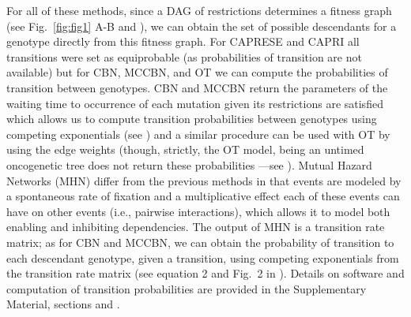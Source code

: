 \documentclass[a4paper,10pt]{article}
\begin{document}
For all of these methods, since a DAG of restrictions determines a fitness
graph (see Fig.~\ref{fig:fig1} A-B and
\cite{diaz-uriarte2018,diaz-uriarte2019a}), we can obtain the set of
possible descendants for a genotype directly from this fitness graph.  For
CAPRESE and CAPRI all transitions were set as equiprobable (as
probabilities of transition are not available) but for CBN, MCCBN, and OT
we can compute the probabilities of transition between genotypes. CBN and
MCCBN return the parameters of the waiting time to occurrence of each
mutation given its restrictions are satisfied which allows us to compute
transition probabilities between genotypes using competing exponentials
(see \cite{montazeri_large-scale_2016, hosseini2019a, diaz-uriarte2019a})
and a similar procedure can be used with OT by using the edge weights
(though, strictly, the OT model, being an untimed oncogenetic tree does
not return these probabilities ---see \cite{diaz-uriarte2019a}). Mutual
Hazard Networks (MHN) \cite{schill2020} differ from the previous methods
in that events are modeled by a spontaneous rate of fixation and a
multiplicative effect each of these events can have on other events (i.e.,
pairwise interactions), which allows it to model both enabling and
inhibiting dependencies. The output of MHN is a transition rate matrix; as
for CBN and MCCBN, we can obtain the probability of transition to each
descendant genotype, given a transition, using competing exponentials from
the transition rate matrix (see equation 2 and Fig.~2 in
\cite{schill2020}). Details on software and computation of transition
probabilities are provided in the Supplementary Material, sections
 and .


\end{document}
